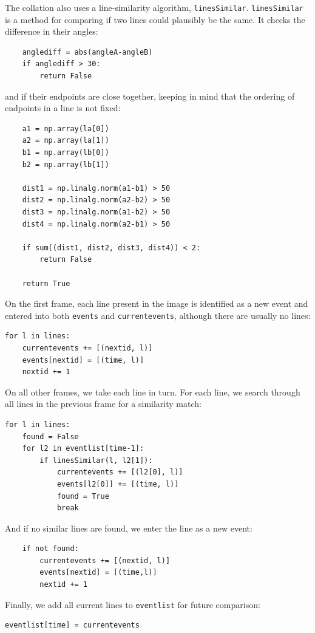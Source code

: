 \documentclass[notitlepage,12pt]{article}
\begin{document}
The collation also uses a line-similarity algorithm, \texttt{linesSimilar}.  \texttt{linesSimilar} is a method for comparing if two lines could plausibly be the same.  It checks the difference in their angles:
\begin{lstlisting}
    anglediff = abs(angleA-angleB)
    if anglediff > 30:
        return False
\end{lstlisting}    
and if their endpoints are close together, keeping in mind that the ordering of endpoints in a line is not fixed:
\begin{lstlisting}
    a1 = np.array(la[0])
    a2 = np.array(la[1])
    b1 = np.array(lb[0])
    b2 = np.array(lb[1])
    
    dist1 = np.linalg.norm(a1-b1) > 50
    dist2 = np.linalg.norm(a2-b2) > 50
    dist3 = np.linalg.norm(a1-b2) > 50
    dist4 = np.linalg.norm(a2-b1) > 50
    
    if sum((dist1, dist2, dist3, dist4)) < 2:
        return False
    
    return True
\end{lstlisting}    

On the first frame, each line present in the image is identified as a new event and entered into both \texttt{events} and \texttt{currentevents}, although there are usually no lines:
\begin{lstlisting}
for l in lines:
    currentevents += [(nextid, l)]
    events[nextid] = [(time, l)]
    nextid += 1
\end{lstlisting}    
    
On all other frames, we take each line in turn.  For each line, we search through all lines in the previous frame for a similarity match:
\begin{lstlisting}
for l in lines:
    found = False
    for l2 in eventlist[time-1]:
        if linesSimilar(l, l2[1]):
            currentevents += [(l2[0], l)]
            events[l2[0]] += [(time, l)]
            found = True
            break
\end{lstlisting}    

And if no similar lines are found, we enter the line as a new event:
\begin{lstlisting}
    if not found:
        currentevents += [(nextid, l)]
        events[nextid] = [(time,l)]
        nextid += 1
\end{lstlisting}    

Finally, we add all current lines to \texttt{eventlist} for future comparison:
\begin{lstlisting}
eventlist[time] = currentevents
\end{lstlisting}    
\end{document}
